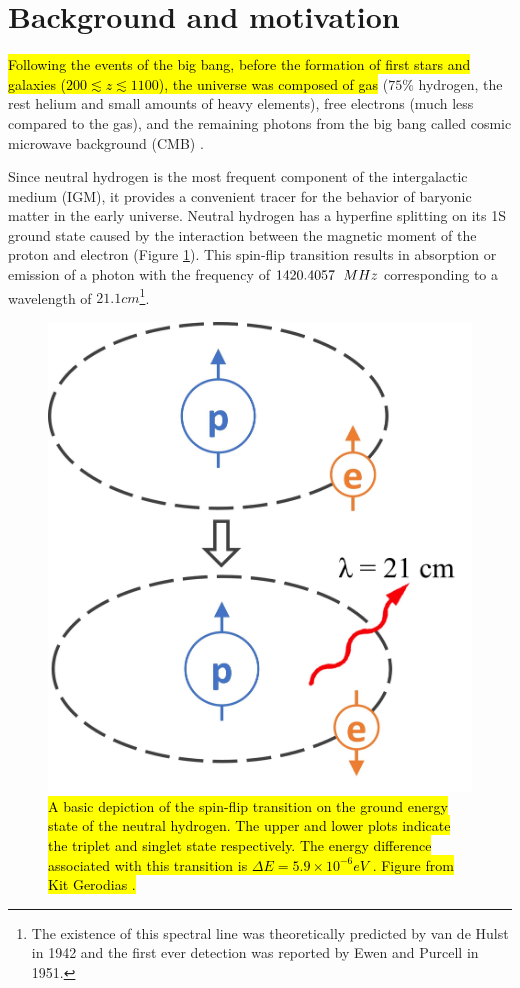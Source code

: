 \documentclass[12pt, TexShade, letterpaper]{report}
\begin{document}
\section{Background and motivation}
\hl{Following the events of the big bang, before the formation of first stars and galaxies ($200 \lesssim z \lesssim 1100$), the universe was composed of gas} ($75\%$ hydrogen, the rest helium and small amounts of heavy elements), free electrons (much less compared to the gas), and the remaining photons from the big bang called cosmic microwave background (CMB) \cite{map_universe, 21century}. \par
Since neutral hydrogen is the most frequent component of the intergalactic medium (IGM), it provides a convenient tracer for the behavior of baryonic matter in the early universe. Neutral hydrogen has a hyperfine splitting on its 1S ground state caused by the interaction between the magnetic moment of the proton and electron (Figure \ref{fig:spinflip}). This spin-flip transition results in absorption or emission of a photon with the frequency of $1420.4057\hspace{0.21cm} MHz$\cite{low_frequency} corresponding to a wavelength of $21.1cm$\cite{21century}\footnote{The existence of this spectral line was theoretically predicted by van de Hulst in 1942 and the first ever detection was reported by Ewen and Purcell in 1951\cite{21century}.}.\par
\begin{figure}[h!]
\centering
\includegraphics[scale =0.4]{spinflip.jpg}
\caption[Spin-flip Transition of Neutral Hydrogen]{\hl{A basic depiction of the spin-flip transition on the ground energy state of the neutral hydrogen. The upper and lower plots indicate the triplet and singlet state respectively. The energy difference associated with this transition is $\Delta E = 5.9 \times 10 ^{-6}eV$ \cite{21century}. Figure from Kit Gerodias \cite{kit_thesis}.}}
\label{fig:spinflip}
\end{figure}
\end{document}
